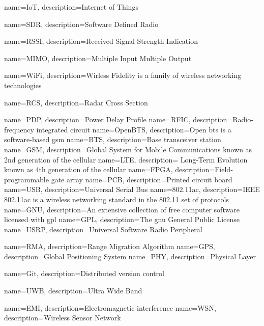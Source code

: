 {
    name=IoT,
    description={Internet of Things}
}


{
    name=SDR,
    description={Software Defined Radio}
}


{
    name=RSSI,
    description={Received Signal Strength Indication}
}


{
    name=MIMO,
    description={Multiple Input Multiple Output}
}


{
    name=WiFi,
    description={Wirless Fidelity is a family of wireless networking technologies}
}

{
    name=RCS,
    description={Radar Cross Section}
}

{
    name=PDP,
    description={Power Delay Profile}
}
{
    name=RFIC,
    description={Radio-frequency integrated circuit}
}
{
    name=OpenBTS,
    description={Open \gls{bts} is a software-based \gls{gsm}}
}
{
    name=BTS,
    description={Base transceiver station}
}
{
    name=GSM,
    description={Global System for Mobile Communications known as 2nd generation of the cellular}
}
{
    name=LTE,
    description={ Long-Term Evolution known as 4th generation of the cellular}
}
{
    name=FPGA,
    description={Field-programmable gate array}
}
{
    name=PCB,
    description={Printed circuit board}
}
{
    name=USB,
    description={Universal Serial Bus}
}
{
    name=802.11ac,
    description={IEEE 802.11ac is a wireless networking standard in the 802.11 set of protocols}
}
{
    name=GNU,
    description={An extensive collection of free computer software licensed with \gls{gpl}}
}
{
    name=GPL,
    description={The \gls{gnu} General Public License}
}
{
    name=USRP,
    description={Universal Software Radio Peripheral}
}

{
    name=RMA,
    description={Range Migration Algorithm}
}
{
    name=GPS,
    description={Global Positioning System}
}
{
    name=PHY,
    description={Physical Layer}
}

{
    name=Git,
    description={Distributed version control}
}


{
    name=UWB,
    description={Ultra Wide Band}
}


{
    name=EMI,
    description={Electromagnetic interference}
}
{
    name=WSN,
    description={Wireless Sensor Network}
}
